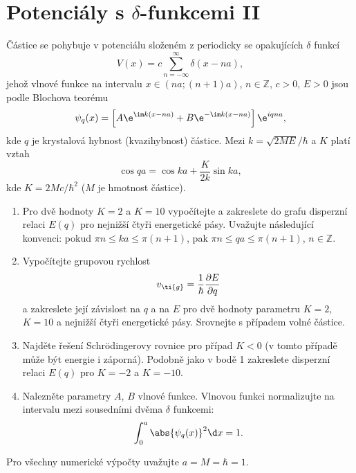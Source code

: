 \section{Potenciály s $\delta$-funkcemi II}
 	Částice se pohybuje v potenciálu složeném z periodicky se opakujících $\delta$ funkcí
 	\begin{equation*}
 		V(x)=c\sum_{n=-\infty}^{\infty}\delta(x-na),
 	\end{equation*}
 	jehož vlnové funkce na intervalu 
 	$x\in\left(na; \left(n+1\right)a\right)$, $n\in\mathbb{Z}$, $c>0$, $E>0$ 
 	jsou podle Blochova teorému
 	\begin{equation*}
 		\psi_{q}(x)
 			=\left[A\e^{\im k\left(x-na\right)}+B\e^{-\im k\left(x-na\right)}\right]\e^{iqna},
 	\end{equation*}
 	kde $q$ je krystalová hybnost (kvazihybnost) částice.
 	Mezi $k=\sqrt{2ME}/\hbar$ a $K$ platí vztah
 	\begin{equation*}
 		\cos{qa}=\cos{ka}+\frac{K}{2k}\sin{ka},
 	\end{equation*}
 	kde $K=2Mc/\hbar^{2}$ ($M$ je hmotnost částice).
 	\begin{enumerate}
 	\item 
 		Pro dvě hodnoty $K=2$ a $K=10$ vypočítejte a zakreslete do grafu disperzní relaci $E(q)$ pro nejnižší čtyři energetické pásy.
 		Uvažujte následující konvenci: pokud $\pi n\leq ka\leq\pi(n+1)$, pak $\pi n\leq qa\leq\pi(n+1)$, $n\in\mathbb{Z}$.
 	\item 
 		Vypočítejte grupovou rychlost
 		\begin{equation*}
 			v_{\ti{g}}=\frac{1}{\hbar}\frac{\partial E}{\partial q}
 		\end{equation*}
 		a zakreslete její závislost na $q$ a na $E$ pro dvě hodnoty parametru $K=2$, $K=10$ a nejnižší čtyři energetické pásy.
 		Srovnejte s případem volné částice.
 	\item
 		Najděte řešení Schrödingerovy rovnice pro případ $K<0$ (v tomto případě může být energie i záporná).
 		Podobně jako v bodě 1 zakreslete disperzní relaci $E(q)$ pro $K=-2$ a $K=-10$.

 	\item 
 		Nalezněte parametry $A$, $B$ vlnové funkce. Vlnovou funkci normalizujte na intervalu mezi sousedními dvěma $\delta$ funkcemi:
 		\begin{equation*}
 			\label{eq:psiqnorm}
 			\int_{0}^{a}\abs{\psi_{q}(x)}^{2}\d x=1.
 		\end{equation*}
 	\end{enumerate}

 	Pro všechny numerické výpočty uvažujte $a=M=\hbar=1$.